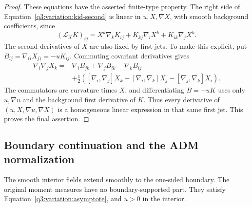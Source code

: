 \begin{proof}
These equations have the asserted finite-type property.  The
right side of Equation~\eqref{q3:variation:kid-second} is linear in
$u,X,\nabla X$, with smooth background coefficients, since
\[
 (\mathcal L_XK)_{ij}
   =X^k\nabla_kK_{ij}
            +K_{kj}\nabla_iX^k+K_{ik}\nabla_jX^k.
\]
The second derivatives of $X$ are also fixed by first jets.  To
make this explicit, put $B_{ij}=\nabla_{(i}X_{j)}=-uK_{ij}$.
Commuting covariant derivatives gives
\begin{equation}
 \begin{split}
 \nabla_i\nabla_jX_k
   ={}&\nabla_i B_{jk}+\nabla_j B_{ik}-\nabla_k B_{ij}\\
     &+\tfrac12\left(
        [\nabla_i,\nabla_j]X_k
        -[\nabla_i,\nabla_k]X_j
        -[\nabla_j,\nabla_k]X_i\right).
 \end{split}
 \label{q3:variation:prolongation}
\end{equation}
The commutators are curvature times $X$, and differentiating $B=-uK$
uses only $u,\nabla u$ and the background first derivative of $K$.
Thus every derivative of $(u,X,\nabla u,\nabla X)$ is a homogeneous
linear expression in that same first jet.  This proves the final
assertion.
\end{proof}

\subsection{Boundary continuation and the ADM normalization}
\label{q3:variation:continuation-subsection}

\begin{lemma}
\label{q3:variation:regularity-normalization}
The smooth interior fields extend smoothly to the one-sided boundary.
The original moment measures have no boundary-supported part.  They
satisfy Equation~\eqref{q3:variation:asymptote}, and $u>0$ in the
interior.
\end{lemma}


